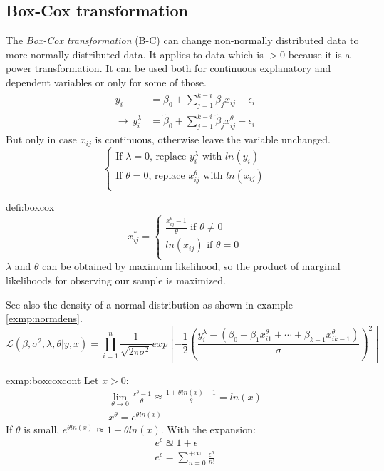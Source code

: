 \subsection{Box-Cox transformation}
	The \emph{Box-Cox transformation} (B-C) can change non-normally distributed data to more normally distributed data. It applies to data which is $>0$ because it is a power transformation. It can be used both for continuous explanatory and dependent variables or only for some of those.
	\begin{align*}
		y_i&=\beta_0+\sum\limits_{j=1}^{k-i} \beta_j x_{ij}+\epsilon_i\\
		\longrightarrow\, y_i^\lambda &=\tilde{\beta}_0+\sum\limits_{j=1}^{k-i} \tilde{\beta}_j x_{ij}^\theta+\epsilon_i
	\end{align*}
	But only in case $x_{ij}$ is continuous, otherwise leave the variable unchanged.
	$$\begin{cases}
		\text{If } \lambda=0 \text{, replace }y_i^\lambda \text{ with } ln(y_i)\\
		\text{If } \theta=0 \text{, replace }x_{ij}^\theta \text{ with } ln(x_{ij})\\
	\end{cases}$$
	\begin{defi}{defi:boxcox}
		$$x_{ij}^*=\begin{cases}
			\frac{x_{ij}^\theta -1}{\theta}\text{ if }\theta\neq 0\\
			ln(x_{ij})\text{ if }\theta= 0\\
		\end{cases}$$
		$\lambda$ and $\theta$ can be obtained by maximum likelihood, so the product of marginal likelihoods for observing our sample is maximized.			
	\end{defi}
	See also the density of a normal distribution as shown in example \ref{exmp:normdens}.	
	$$\mathcal{L}(\beta,\sigma^2,\lambda,\theta|y,x)=\prod_{i=1}^{n} \frac{1}{\sqrt{2\pi\sigma^2}}exp\left[-\frac{1}{2}\left(\frac{y_i^\lambda-(\beta_0+\beta_1 x_{i1}^\theta+\cdots+\beta_{k-1} x_{ik-1}^\theta)}{\sigma}\right)^2\right]$$		
	\begin{exmp}{exmp:boxcoxcont}
		Let $x>0$:
		\begin{gather*}
			\lim\limits_{\theta\rightarrow 0} \frac{x^\theta -1}{\theta} \approxeq \frac{1+\theta ln(x) -1}{\theta}=ln(x)\\
			x^\theta= e^{\theta ln(x)}
		\end{gather*}
		If $\theta$ is small, $e^{\theta ln(x)}\approxeq 1+\theta ln(x)$.
		With the expansion:
		\begin{gather*}
			e^\epsilon \approxeq 1+\epsilon\\
			e^\epsilon=\sum\limits_{n=0}^{+\infty} \frac{\epsilon^n}{n!}
		\end{gather*}
	\end{exmp}
